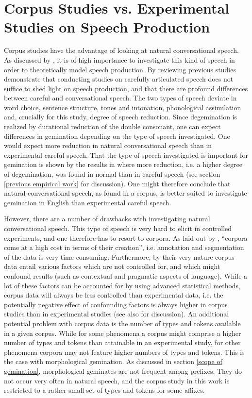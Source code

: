 \section{Corpus Studies vs. Experimental Studies on Speech Production} \label{corpus and experimental studies}


Corpus studies have the advantage of looking at natural conversational speech. As discussed by \cite{Tucker.2016}, it is of high importance to investigate this kind of speech in order to theoretically model speech production.  By reviewing previous studies \cite{Tucker.2016} demonstrate that conducting studies on carefully articulated speech does not suffice to shed light on speech production, and that there are profound differences between careful and conversational speech. The two types of speech deviate in word choice, sentence structure, tones and intonation, phonological assimilation and, crucially for this study, degree of speech reduction. Since degemination is realized by durational reduction of the double consonant, one can expect differences in gemination depending on the type of speech investigated. One would expect more reduction in natural conversational speech than in experimental careful speech. That the type of speech investigated is important for gemination is shown by the results in \cite{Oh.2012} where more reduction, i.e. a higher degree of degemination, was found in normal than in careful speech (see section \ref{previous empirical work} for discussion). One might therefore conclude that natural conversational speech, as found in a corpus, is better suited to investigate gemination in English than experimental careful speech.

However, there are a number of drawbacks with investigating natural conversational speech. This type of speech is very hard to elicit in controlled experiments, and one therefore has to resort to corpora. As laid out by \citet[21]{Tucker.2016}, ``corpora come at a high cost in terms of their creation'', i.e. annotation and segmentation of the data is very time consuming. 
Furthermore, by their very nature corpus data entail various factors which are not controlled for, and which might confound results (such as contextual and pragmatic aspects of language). While a lot of these factors can be accounted for by using advanced statistical methods, corpus data will always be less controlled than experimental data, i.e. the potentially negative effect of confounding factors is always higher in corpus studies than in experimental studies (see also \citet[144]{Kunter.13.04.2017} for discussion).
An additional potential problem with corpus data is the number of types and tokens available in a given corpus. While for some phenomena a corpus might comprise a higher number of types and tokens than attainable in an experimental study, for other phenomena corpora may not feature higher numbers of types and tokens. This is the case with morphological gemination. As discussed in section \ref{scope of gemination}, morphological geminates are not frequent among prefixes. They do not occur very often in natural speech, and the corpus study in this work is restricted to a rather small set of types and tokens for some affixes. 

